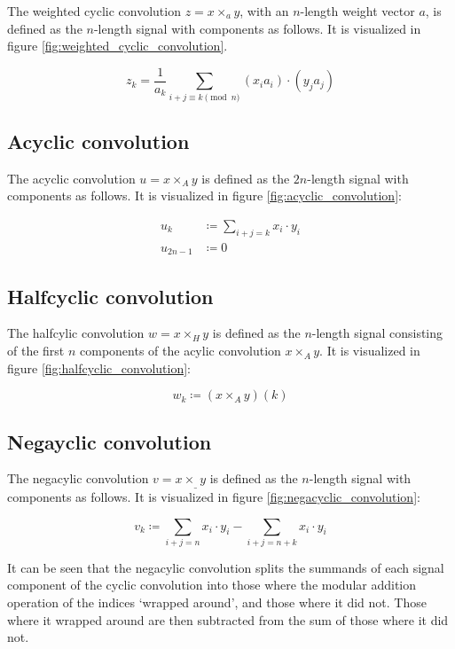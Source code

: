 The weighted cyclic convolution $z = x \times_a y$, with an $n$-length weight
vector $a$, is defined as the $n$-length signal with components as follows. It
is visualized in figure \ref{fig:weighted_cyclic_convolution}.

\[
		z_k = \frac{1}{a_k} \sum_{i + j \equiv k \pmod{n}} (x_i a_i) \cdot (y_j a_j)
\]

\subsection{Acyclic convolution}

The acyclic convolution $u = x \times_A y$ is defined as the $2n$-length signal
with components as follows. It is visualized in figure
\ref{fig:acyclic_convolution}:

\begin{align*}
		u_k & \coloneqq \sum_{i + j = k} x_i \cdot y_i \\
		u_{2n - 1} & \coloneqq 0
\end{align*}

\subsection{Halfcyclic convolution}

The halfcylic convolution $w = x \times_H y$ is defined as the $n$-length
signal consisting of the first $n$ components of the acylic convolution $x
\times_A y$. It is visualized in figure \ref{fig:halfcyclic_convolution}:

\[
		w_k \coloneqq (x \times_A y)(k)
\]

\subsection{Negayclic convolution}

The negacylic convolution $v = x \times_\_ y$ is defined as the $n$-length signal
with components as follows. It is visualized in figure
\ref{fig:negacyclic_convolution}:

\[
		v_k \coloneqq \sum_{i + j = n} x_i \cdot y_i - \sum_{i + j = n + k} x_i \cdot y_i
\]

It can be seen that the negacylic convolution splits the summands of each
signal component of the cyclic convolution into those where the modular
addition operation of the indices `wrapped around', and those where it did not.
Those where it wrapped around are then subtracted from the sum of those where
it did not.


